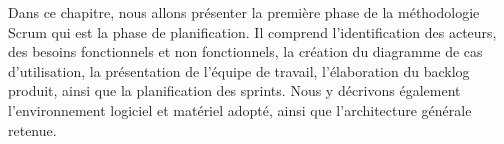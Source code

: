 \begin{justify}
    Dans ce chapitre, nous allons présenter la première phase de la méthodologie Scrum qui est la phase de planification. Il comprend l’identification des acteurs, des besoins fonctionnels et non fonctionnels, la création du diagramme de cas d’utilisation, la présentation de l’équipe de travail, l’élaboration du backlog produit, ainsi que la planification des sprints. Nous y décrivons également l’environnement logiciel et matériel adopté, ainsi que l’architecture générale retenue.
\end{justify}


